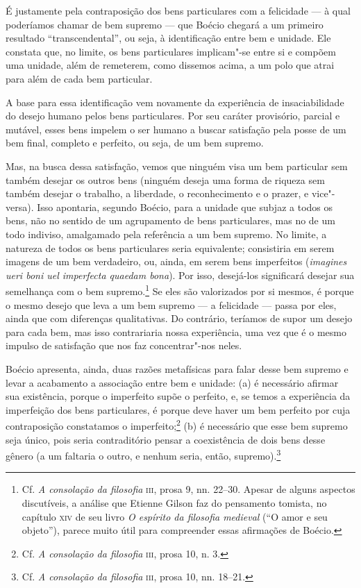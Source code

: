 É justamente pela contraposição dos bens particulares com a
felicidade --- à qual poderíamos chamar de bem supremo --- que
Boécio chegará a um primeiro resultado “transcendental”, ou
seja, à identificação entre bem e unidade. Ele constata que, no
limite, os bens particulares implicam"-se entre si e compõem uma
unidade, além de remeterem, como dissemos acima, a um polo que
atrai para além de cada bem particular.

A base para essa identificação vem novamente da experiência de
insaciabilidade do desejo humano pelos bens particulares. Por
seu caráter provisório, parcial e mutável, esses bens impelem o
ser humano a buscar satisfação pela posse de um bem final,
completo e perfeito, ou seja, de um bem supremo.

Mas, na busca dessa satisfação, vemos que ninguém visa um bem
particular sem também desejar os outros bens (ninguém deseja uma
forma de riqueza sem também desejar o trabalho, a liberdade, o
reconhecimento e o prazer, e vice"-versa). Isso apontaria,
segundo Boécio, para a unidade que subjaz a todos os bens, não
no sentido de um agrupamento de bens particulares, mas no de um
todo indiviso, amalgamado pela referência a um bem supremo. No
limite, a natureza de todos os bens particulares seria
equivalente; consistiria em serem imagens de um bem verdadeiro,
ou, ainda, em serem bens imperfeitos (\emph{imagines ueri boni
uel imperfecta quaedam bona}). Por isso, desejá-los significará
desejar sua semelhança com o bem supremo.\footnote{ Cf. \emph{A
consolação da filosofia} \textsc{iii}, prosa 9, nn. 22--30. Apesar de
alguns aspectos discutíveis, a análise que Etienne Gilson faz do
pensamento tomista, no capítulo \textsc{xiv} de seu livro \emph{O
espírito da filosofia medieval} (“O amor e seu objeto”), parece
muito útil para compreender essas afirmações de Boécio.} Se
eles são valorizados por si mesmos, é porque o mesmo desejo que
leva a um bem supremo --- a felicidade --- passa por eles, ainda que
com diferenças qualitativas. Do contrário, teríamos de supor um
desejo para cada bem, mas isso contrariaria nossa experiência,
uma vez que é o mesmo impulso de satisfação que nos faz
concentrar"-nos neles.

Boécio apresenta, ainda, duas razões metafísicas para falar desse
bem supremo e levar a acabamento a associação entre bem e
unidade: (a) é necessário afirmar sua existência, porque o
imperfeito supõe o perfeito, e, se temos a experiência da
imperfeição dos bens particulares, é porque deve haver um bem
perfeito por cuja contraposição constatamos o
imperfeito;\footnote{ Cf. \emph{A consolação da filosofia}
\textsc{iii},
prosa 10, n. 3.} (b) é necessário que esse bem supremo seja
único, pois seria contraditório pensar a coexistência de dois
bens desse gênero (a um faltaria o outro, e nenhum seria, então,
supremo).\footnote{ Cf. \emph{A consolação da filosofia} \textsc{iii},
prosa 10, nn. 18--21.}


